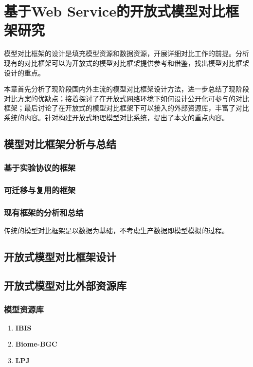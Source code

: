 \chapter{基于Web Service的开放式模型对比框架研究}

模型对比框架的设计是填充模型资源和数据资源，开展详细对比工作的前提。分析现有的对比框架可以为开放式的模型对比框架提供参考和借鉴，找出模型对比框架设计的重点。

本章首先分析了现阶段国内外主流的模型对比框架设计方法，进一步总结了现阶段对比方案的优缺点；接着探讨了在开放式网络环境下如何设计公开化可参与的对比框架；最后讨论了在开放式的模型对比框架下可以接入的外部资源库，丰富了对比系统的内容。针对构建开放式地理模型对比系统，提出了本文的重点内容。

\section{模型对比框架分析与总结}
\subsection{基于实验协议的框架}

\subsection{可迁移与复用的框架}

\subsection{现有框架的分析和总结}
传统的模型对比框架是以数据为基础，不考虑生产数据即模型模拟的过程。

\section{开放式模型对比框架设计}



\section{开放式模型对比外部资源库}

\subsection{模型资源库}
\begin{enumerate}[(1)]
\item \textbf{IBIS}

\item \textbf{Biome-BGC}

\item \textbf{LPJ}

\end{enumerate}


